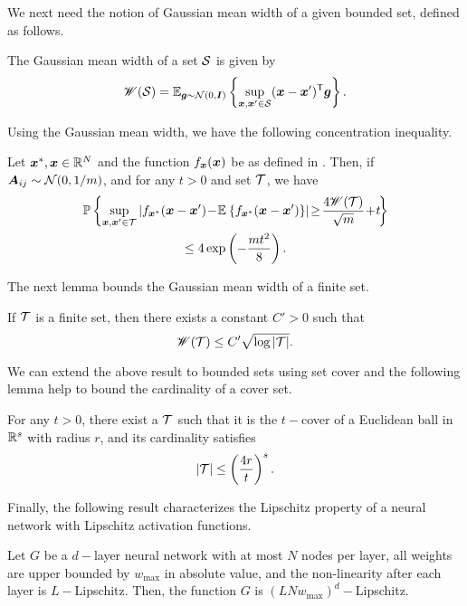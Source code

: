 \documentclass[journal]{IEEEtran}
\newcommand{\wid}{\mathscr{W}}
\begin{document}
We next need the notion of Gaussian mean width of a given bounded set, defined as follows.
\begin{defn}\label{eq:def:GaussianWidth}
The Gaussian mean width of a set $\mathcal{S}$ is given by
\begin{equation}
\wid(\calS) = \expect{\vecg\sim\Gauss(0,\eye)}{\underset{\vecx,\vecx'\in\calS}{\sup}(\vecx-\vecx')\tran\vecg}.
\end{equation}
\end{defn}
Using the Gaussian mean width, we have the following concentration inequality. 
\begin{lemma}\label{lem:concen}
Let $\boldsymbol{x}^*,\boldsymbol{x}\in\mathbb{R}^N$ and the function $f_{\boldsymbol{x}}(\boldsymbol{x})$ be as defined in . 
Then,  if $\boldsymbol{A}_{ij}\sim\mathcal{N}(0,1/m)$, and for any $t>0$ and set $\mathcal{T}$, we have
\begin{multline}\label{eq:concen}
    \bbP\lc\underset{\vecx,\vecx'\in\calT}{\sup}\lv f_{\vecx^*}(\vecx-\vecx') \!-\! \expect{}{f_{\vecx^*}(\vecx-\vecx')}\rv \!\geq\! \frac{4\wid(\calT)}{\sqrt{m}}\!+\!t\!\rc\\
    \leq 4\exp\lb-\frac{mt^2}{8}\rb.
\end{multline}
\end{lemma}
The next lemma bounds the Gaussian mean width of a finite set.
\begin{lemma}\label{lem:GWidth}
If $\mathcal{T}$ is a finite set, then there exists a constant $C'>0$ such that 
\begin{equation}
    \wid(\calT)\leq C'\sqrt{\log \lv\calT\rv}.
\end{equation}
\end{lemma}
We can extend the above result to bounded sets using set cover and the following lemma help to bound the cardinality of a cover set.
\begin{lemma}\label{lem:covering}
For any $t>0$, there exist a $\mathcal{T}$ such that it is the $t-$cover of a Euclidean ball in $\mathbb{R}^s$ with radius $r$, and its cardinality satisfies 
\begin{equation}
\left\vert\mathcal{T}\right\vert\leq \left(\frac{4r}{t}\right)^{s}.
\end{equation}
\end{lemma}
Finally, the following result characterizes the Lipschitz property of a neural network with Lipschitz activation functions. 
\begin{lemma}\label{lem:lipschitz}
Let $G$ be a $d-$layer neural network with at most $N$ nodes per layer, all weights are upper bounded by  $ w_{\max}$ in absolute value, and the non-linearity after each layer is $L-$Lipschitz. Then, the function $G$ is $(L Nw_{\max})^d-$Lipschitz.
\end{lemma}
\end{document}
